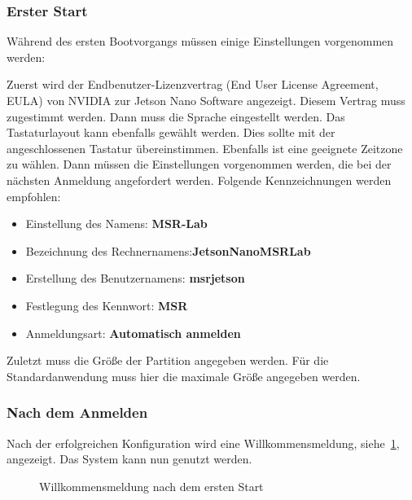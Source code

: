 \subsubsection{Erster Start}

Während des ersten Bootvorgangs müssen einige Einstellungen vorgenommen werden:


\bigskip

Zuerst wird der Endbenutzer-Lizenzvertrag (End User License Agreement, EULA) von NVIDIA zur Jetson Nano Software angezeigt. Diesem Vertrag muss zugestimmt werden. Dann muss die Sprache eingestellt werden. Das Tastaturlayout kann ebenfalls gewählt werden. Dies sollte mit der angeschlossenen Tastatur übereinstimmen. Ebenfalls ist eine geeignete Zeitzone zu wählen. Dann müssen die Einstellungen vorgenommen werden, die bei der nächsten Anmeldung angefordert werden. Folgende Kennzeichnungen werden empfohlen:

	\begin{itemize}
		\item Einstellung des Namens: \textbf{MSR-Lab}
		\item Bezeichnung des Rechnernamens:\textbf{JetsonNanoMSRLab}
		\item Erstellung des Benutzernamens: \textbf{msrjetson}
		\item Festlegung des Kennwort: \textbf{MSR}
		\item Anmeldungsart: \textbf{Automatisch anmelden}
	\end{itemize}

Zuletzt muss die Größe der Partition angegeben werden. Für die Standardanwendung muss hier die maximale Größe angegeben werden. 




\subsubsection{Nach dem Anmelden}

Nach der erfolgreichen Konfiguration wird eine Willkommensmeldung, siehe~\ref{Jetson:Willkommen}, angezeigt. Das System kann nun genutzt werden.


\begin{figure}
  \centering
  
 
  \caption{Willkommensmeldung nach dem ersten Start}\label{Jetson:Willkommen}
\end{figure}



